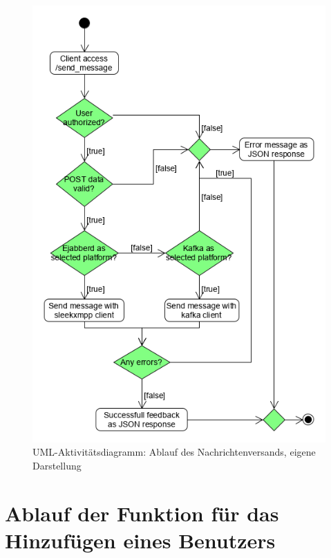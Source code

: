 \documentclass[a4paper,titlepage,halfparskip,12pt]{scrreprt}
\begin{document}
\begin{figure}[h]
	\centering
	\includegraphics[width=.7\textwidth]{images/umlSendMessage}
	\caption{\acs{UML}-Aktivitätsdiagramm: Ablauf des Nachrichtenversands, eigene Darstellung}
	\label{img:umlActivitySendMessage}
\end{figure}

\pagebreak

\section{Ablauf der Funktion für das Hinzufügen eines Benutzers}
\end{document}

